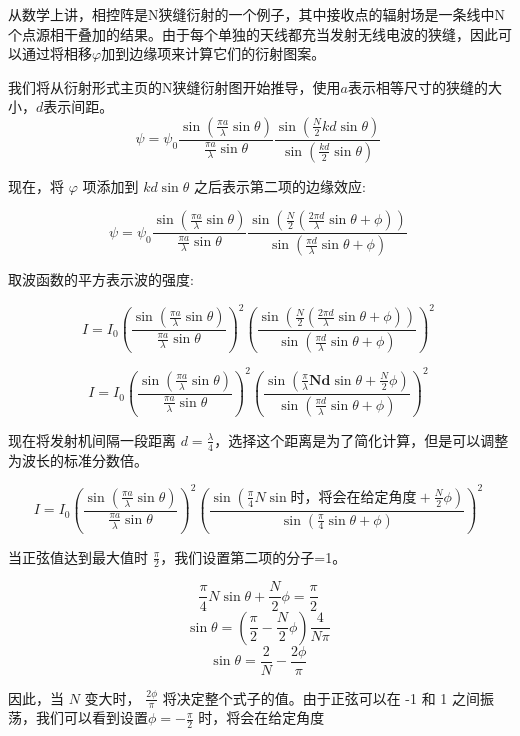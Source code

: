 从数学上讲，相控阵是N狭缝衍射的一个例子，其中接收点的辐射场是一条线中N个点源相干叠加的结果。由于每个单独的天线都充当发射无线电波的狭缝，因此可以通过将相移$\varphi$加到边缘项来计算它们的衍射图案。

我们将从衍射形式主页的N狭缝衍射图开始推导，使用$a$表示相等尺寸的狭缝的大小，$d$表示间距。
$$\psi = \psi_0 \frac{\sin\left( \frac{\pi a}{\lambda} \sin \theta \right)}{\frac{\pi a}{\lambda} \sin \theta} \frac{\sin\left( \frac{N}{2} kd \sin \theta \right)}{\sin \left( \frac{kd}{2} \sin \theta \right)}~$$

现在，将 $\varphi$ 项添加到 $kd \sin \theta$ 之后表示第二项的边缘效应:

$$\psi = \psi_0 \frac{\sin\left( \frac{\pi a}{\lambda} \sin \theta \right)}{\frac{\pi a}{\lambda} \sin \theta} \frac{\sin\left( \frac{N}{2} \left(  \frac{2\pi d}{\lambda} \sin \theta + \phi \right) \right)}{\sin \left( \frac{\pi d}{\lambda} \sin \theta + \phi \right)}~$$

取波函数的平方表示波的强度:

$$I = I_0 \left( \frac{\sin\left( \frac{\pi a}{\lambda} \sin \theta \right)}{\frac{\pi a}{\lambda} \sin \theta} \right)^2 \left( \frac{\sin\left( \frac{N}{2} \left( \frac{2\pi d}{\lambda} \sin \theta + \phi \right) \right)}{\sin \left( \frac{\pi d}{\lambda} \sin \theta + \phi \right)} \right)^2~$$

$$I = I_0 \left( \frac{\sin\left( \frac{\pi a}{\lambda} \sin \theta \right)}{\frac{\pi a}{\lambda} \sin \theta} \right)^2 \left( \frac{\sin\left( \frac{\pi}{\lambda}\mathbf{Nd}\sin \theta + \frac{N}{2} \phi \right)}{\sin \left( \frac{\pi d}{\lambda} \sin \theta + \phi \right)} \right)^2~$$

现在将发射机间隔一段距离 $d = \frac{\lambda}{4}$，选择这个距离是为了简化计算，但是可以调整为波长的标准分数倍。

$$I = I_0 \left( \frac{\sin \left( \frac{\pi a}{\lambda} \sin \theta \right)}{\frac{\pi a}{\lambda} \sin \theta} \right)^2 \left( \frac{\sin \left( \frac{\pi}{4} N \sin 时，将会在给定角度 + \frac{N}{2} \phi \right)}{\sin \left( \frac{\pi}{4} \sin \theta + \phi \right)} \right)^2~$$

当正弦值达到最大值时 $\frac{\pi}{2}$，我们设置第二项的分子=1。

$$\frac{\pi}{4} N \sin \theta + \frac{N}{2} \phi = \frac{\pi}{2}~$$
$$\sin \theta = \left( \frac{\pi}{2} - \frac{N}{2} \phi \right) \frac{4}{N \pi}~$$
$$\sin \theta = \frac{2}{N} - \frac{2 \phi}{\pi}~$$

因此，当 $N$ 变大时， $\frac{2\phi}{\pi}$ 将决定整个式子的值。由于正弦可以在 -1 和 1 之间振荡，我们可以看到设置$\phi = -\frac{\pi}{2}$
时，将会在给定角度

